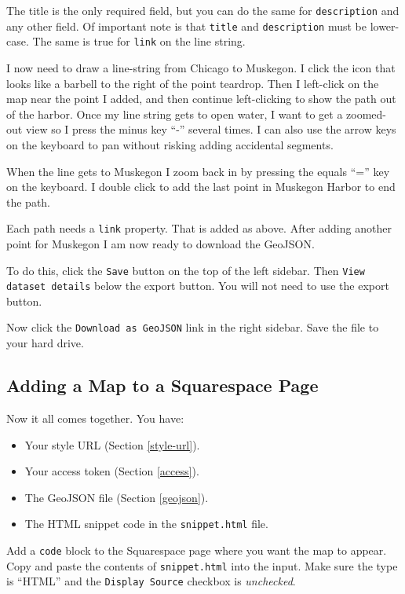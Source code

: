 \documentclass[11pt]{article}
\begin{document}
The title is the only required field, but you can do the same for
\texttt{description} and any other field. Of important note is that
\texttt{title} and \texttt{description} must be lower-case. The same
is true for \texttt{link} on the line string.

I now need to draw a line-string from Chicago to Muskegon. I click the
icon that looks like a barbell to the right of the point
teardrop. Then I left-click on the map near the point I added, and
then continue left-clicking to show the path out of the harbor. Once
my line string gets to open water, I want to get a zoomed-out view so
I press the minus key ``-'' several times. I can also use the arrow
keys on the keyboard to pan without risking adding accidental
segments.

When the line gets to Muskegon I zoom back in by pressing the equals
``='' key on the keyboard. I double click to add the last point in
Muskegon Harbor to end the path.

Each path needs a \texttt{link} property. That is added as
above. After adding another point for Muskegon I am now ready to
download the GeoJSON.

To do this, click the \texttt{Save} button on the top of the left
sidebar. Then \texttt{View dataset details} below the export
button. You will not need to use the export button.

Now click the \texttt{Download as GeoJSON} link in the right
sidebar. Save the file to your hard drive.

\subsection{Adding a Map to a Squarespace Page}

Now it all comes together. You have:

\begin{itemize}
\item Your style URL (Section \ref{style-url}).
\item Your access token (Section \ref{access}).
\item The GeoJSON file (Section \ref{geojson}).
\item The HTML snippet code in the \texttt{snippet.html} file.

\end{itemize}

Add a \texttt{code} block to the Squarespace page where you want the
map to appear. Copy and paste the contents of \texttt{snippet.html}
into the input. Make sure the type is ``HTML'' and the \texttt{Display
  Source} checkbox is \emph{unchecked}.
\end{document}

